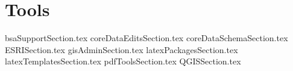 %

\chapter{Tools}
{bsaSupportSection.tex}
\clearpage
{coreDataEditsSection.tex}
\clearpage
{coreDataSchemaSection.tex}
\clearpage
{ESRISection.tex}
\clearpage
{gisAdminSection.tex}
\clearpage
{latexPackagesSection.tex}
\clearpage
{latexTemplatesSection.tex}
\clearpage
{pdfToolsSection.tex}
\clearpage
{QGISSection.tex}

